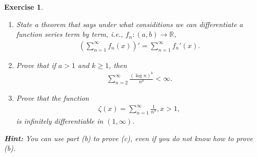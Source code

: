 \documentclass[11pt]{article}
\newtheorem{exercise}{Exercise}[section]
\theoremstyle{definition}
\numberwithin{equation}{subsection}
\begin{document}
\medskip

\begin{exercise}
~\begin{enumerate}[label=(\alph*)]
    \item State a theorem that says under what considitions we can differentiate a function series term by term, i.e., $f_n:(a,b) \to \mathbb{R}$,
    \begin{align*}
        \left(\sum^\infty_{n=1}f_n(x) \right)' = \sum^\infty_{n=1} f_n'(x).
    \end{align*}
    
    \item Prove that if $a > 1$ and $k \geq 1$, then
    \begin{align*}
        \sum^\infty_{n=2} \frac{(\log n)^k}{n^a} < \infty.
    \end{align*}
    
    \item Prove that the function
    \begin{align*}
        \zeta(x) = \sum^\infty_{n=1} \frac{1}{n^x}, x > 1,
    \end{align*}
    is infinitely differentiable in $(1, \infty)$.
\end{enumerate}
{\bf Hint:} You can use part (b) to prove (c), even if you do not know how to prove (b).
\end{exercise}
\end{document}
